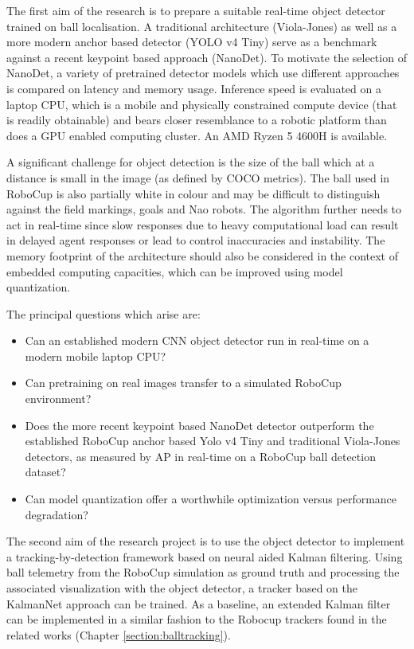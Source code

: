\documentclass[a4paper,twoside,12pt]{report}
\begin{document}
The first aim of the research is to prepare a suitable real-time object detector trained on ball localisation. A traditional architecture (Viola-Jones) as well as a more modern anchor based detector (YOLO v4 Tiny) serve as a benchmark against a recent keypoint based approach (NanoDet). To motivate the selection of NanoDet, a variety of pretrained detector models which use different approaches is compared on latency and memory usage. Inference speed is evaluated on a laptop CPU, which is a mobile and physically constrained compute device (that is readily obtainable) and bears closer resemblance to a robotic platform than does a GPU enabled computing cluster. An AMD Ryzen 5 4600H is available. 

A significant challenge for object detection is the size of the ball which at a distance is small in the image (as defined by COCO metrics). The ball used in RoboCup is also partially white in colour and may be difficult to distinguish against the field markings, goals and Nao robots. The algorithm further needs to act in real-time since slow responses due to heavy computational load can result in delayed agent responses or lead to control inaccuracies and instability. The memory footprint of the architecture should also be considered in the context of embedded computing capacities, which can be improved using model quantization.

The principal questions which arise are:
\begin{itemize}
    \item Can an established modern CNN object detector run in real-time on a modern mobile laptop CPU?
    \item Can pretraining on real images transfer to a simulated RoboCup environment?
    \item Does the more recent keypoint based NanoDet detector outperform the established RoboCup anchor based Yolo v4 Tiny and traditional Viola-Jones detectors, as measured by AP in real-time on a RoboCup ball detection dataset? 
    \item Can model quantization offer a worthwhile optimization versus performance degradation? 
\end{itemize}

The second aim of the research project is to use the object detector to implement a tracking-by-detection framework based on neural aided Kalman filtering. Using ball telemetry from the RoboCup simulation as ground truth and processing the associated visualization with the object detector, a tracker based on the KalmanNet approach can be trained. As a baseline, an extended Kalman filter can be implemented in a similar fashion to the Robocup trackers found in the related works (Chapter \ref{section:balltracking}). 
\end{document}
